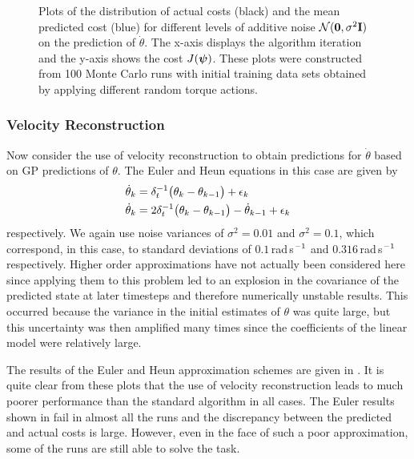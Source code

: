 \begin{figure}
{
\label{fig:heu2}
}
\caption{Plots of the distribution of actual costs (black) and the mean predicted cost (blue) for different levels of additive noise $\mathcal{N}(\mathbf{0},\sigma^2\mathbf{I})$ on the prediction of $\dot\theta$. The x-axis displays the algorithm iteration and the y-axis shows the cost $J(\boldsymbol{\psi})$. These plots were constructed from 100 Monte Carlo runs with initial training data sets obtained by applying different random torque actions.}
\label{fig:differ}
\end{figure}




\subsubsection{Velocity Reconstruction}
Now consider the use of velocity reconstruction to obtain predictions for $\dot\theta$ based on GP predictions of $\theta$. The Euler and Heun equations in this case are given by
\begin{align}
\dot\theta_k &= \delta_t^{-1}\big(\theta_k - \theta_{k-1}\big) + \epsilon_k
\label{eqn:pen_eulv} \\
\dot\theta_k &= 2\delta_t^{-1}\big(\theta_k - \theta_{k-1} \big) - \dot\theta_{k-1} + \epsilon_k
\label{eqn:pen_heuv}
\end{align}
respectively. We again use noise variances of $\sigma^2=0.01$ and $\sigma^2=0.1$, which correspond, in this case, to standard deviations of $0.1\,$rad$\,$s$^{-1}$ and $0.316\,$rad$\,$s$^{-1}$ respectively. Higher order approximations have not actually been considered here since applying them to this problem led to an explosion in the covariance of the predicted state at later timesteps and therefore numerically unstable results. This occurred because the variance in the initial estimates of $\theta$ was quite large, but this uncertainty was then amplified many times since the coefficients of the linear model were relatively large.

The results of the Euler and Heun approximation schemes are given in . It is quite clear from these plots that the use of velocity reconstruction leads to much poorer performance than the standard algorithm in all cases. The Euler results shown in  fail in almost all the runs and the discrepancy between the predicted and actual costs is large. However, even in the face of such a poor approximation, some of the runs are still able to solve the task.

